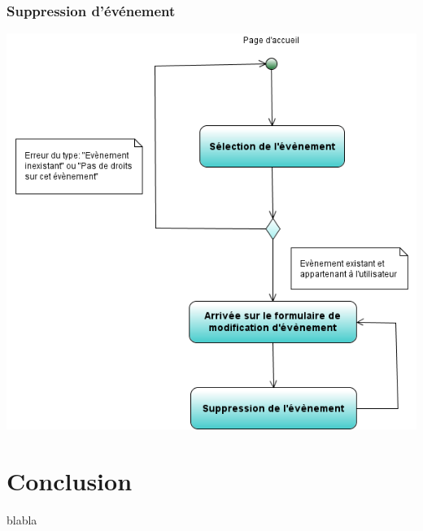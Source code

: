 \documentclass[12pt , a4paper]{article}
\begin{document}
\subsubsection{Suppression d'événement}
\begin{center}
  \includegraphics[scale=0.6]{./images/diag_act_suppression_evenement.png}
\end{center}


\newpage	
\section{Conclusion}
blabla
\end{document}
